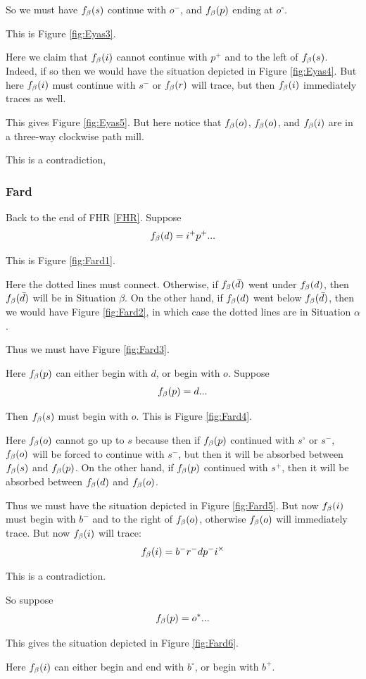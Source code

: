 So we must have $f_\beta(s)$ continue with $o^-$, and $f_\beta(p)$ ending at $o^\circ$. 

This is Figure \ref{fig:Eyas3}.

Here we claim that $f_\beta(i)$ cannot continue with $p^+$ and to the left of $f_\beta(s)$. Indeed, if so then we would have the situation depicted in Figure \ref{fig:Eyas4}. But here $f_\beta(i)$ must continue with $s^-$ or $f_\beta(r)$ will trace, but then $f_\beta(i)$ immediately traces as well.

This gives Figure \ref{fig:Eyas5}. But here notice that $f_\beta(o)$, $f_\beta(o)$, and $f_\beta(i)$ are in a three-way clockwise path mill. 

This is a contradiction,

\subsubsection{Fard}\label{Fard}
Back to the end of FHR \ref{FHR}. Suppose
\[
f_\beta(d) = i^+ p^+...
\]

This is Figure \ref{fig:Fard1}.

Here the dotted lines must connect. Otherwise, if $f_\beta(\bar{d})$ went under $f_\beta(d)$, then $f_\beta(\bar{d})$ will be in Situation $\beta$. On the other hand, if $f_\beta(d)$ went below $f_\beta(\bar{d})$, then we would have Figure \ref{fig:Fard2}, in which case the dotted lines are in Situation $\alpha$.


Thus we must have Figure \ref{fig:Fard3}.

Here $f_\beta(p)$ can either begin with $d$, or begin with $o$. Suppose
\[
f_\beta(p) = d...
\]

Then $f_\beta(s)$ must begin with $o$. This is Figure \ref{fig:Fard4}.

Here $f_\beta(o)$ cannot go up to $s$ because then if $f_\beta(p)$ continued with $s^\circ$ or $s^-$, $f_\beta(o)$ will be forced to continue with $s^-$, but then it will be absorbed between $f_\beta(s)$ and $f_\beta(p)$. On the other hand, if $f_\beta(p)$ continued with $s^+$, then it will be absorbed between $f_\beta(d)$ and $f_\beta(o)$.

Thus we must have the situation depicted in Figure \ref{fig:Fard5}. But now $f_\beta(i)$ must begin with $b^-$ and to the right of $f_\beta(o)$, otherwise $f_\beta(o)$ will immediately trace. But now $f_\beta(i)$ will trace:
\[
f_\beta(i) = b^- r^- d p^- i^\times
\]

This is a contradiction.

So suppose
\[
f_\beta(p) = o^*...
\]

This gives the situation depicted in Figure \ref{fig:Fard6}.

Here $f_\beta(i)$ can either begin and end with $b^\circ$, or begin with $b^+$.

